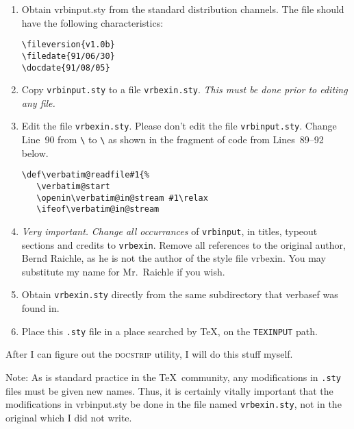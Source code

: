 \documentclass[pagesize=auto]{scrartcl}
\makeatletter
\newcommand*{\pkg}[1]{\textsf{#1}}
\newcommand*{\cs}[1]{\texttt{\textbackslash#1}}
\newcommand*{\cmd}[1]{\cs{\expandafter\@gobble\string#1}}
\makeatother
\begin{document}
\begin{enumerate}
\item \label{item:1}
  Obtain \pkg{vrbinput.sty} from the standard distribution channels.  The file 
  should have the following characteristics:
\begin{verbatim}
\fileversion{v1.0b}
\filedate{91/06/30}
\docdate{91/08/05}
\end{verbatim}

\item Copy \texttt{vrbinput.sty} to a file \texttt{vrbexin.sty}.  \emph{This must be done prior to
   editing any file.}

\item Edit the file \texttt{vrbexin.sty}.  Please don't edit the file \texttt{vrbinput.sty}.
  Change Line~90 from \cmd{\verbatim@startline} to \cmd{\verbatim@start}
  as shown in the fragment of code from Lines~89--92 below.
\begin{verbatim}
\def\verbatim@readfile#1{%
   \verbatim@start
   \openin\verbatim@in@stream #1\relax
   \ifeof\verbatim@in@stream
\end{verbatim}

\item \label{item:4} \emph{Very important.}  \emph{Change all occurrances} of \texttt{vrbinput}, in titles, typeout
  sections and credits to \texttt{vrbexin}.  Remove all references to the original
  author, Bernd Raichle, as he is not the author of the style file \pkg{vrbexin}.
  You may substitute my name for Mr.~Raichle if you wish.

\item \label{item:5} Obtain \texttt{vrbexin.sty} directly from the same subdirectory that \pkg{verbasef} was
  found in.

\item Place this \texttt{.sty} file in a place searched by \TeX, on the \texttt{TEXINPUT} path.
\end{enumerate}
%
After I can figure out the \textsc{docstrip} utility, I will do this stuff myself.

Note: As is standard practice in the \TeX\ community, any modifications in 
\texttt{.sty} files must be given new names.  Thus, it is certainly vitally important
that the modifications in \pkg{vrbinput.sty} be done in the file named
\texttt{vrbexin.sty}, not in the original which I did not write.
\end{document}
